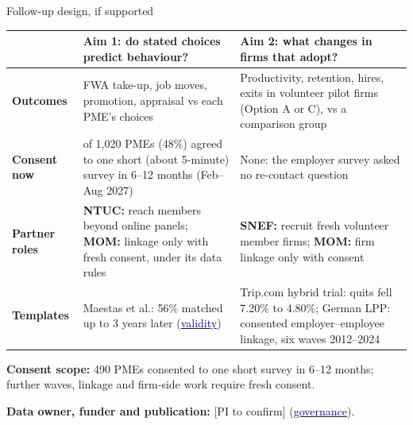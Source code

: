 \begin{frame}[t,label=B-followup]{Follow-up design, if supported}
  \FrameTop %
  {\TableFont\setlength{\tabcolsep}{4pt}\renewcommand{\arraystretch}{1.0}\renewcommand{\RowSep}{\addlinespace[1.5pt]}%
  \begin{tabularx}{\linewidth}{@{}>{\RaggedRight}p{1.85cm}>{\RaggedRight}X>{\RaggedRight\arraybackslash}X@{}}
    \toprule
     & \textbf{Aim 1: do stated choices predict behaviour?} & \textbf{Aim 2: what changes in firms that adopt?}\\
    \midrule
    \textbf{Outcomes} & FWA take-up, job moves, promotion, appraisal vs each PME's choices & Productivity, retention, hires, exits in volunteer pilot firms (Option A or C), vs a comparison group\\ \RowSep
    \textbf{Consent now} & 490 of 1,020 PMEs (48\%) agreed to one short (about 5-minute) survey in 6--12 months (Feb--Aug 2027) & None: the employer survey asked no re-contact question\\ \RowSep
    \textbf{Partner roles} & \textbf{NTUC:} reach members beyond online panels; \textbf{MOM:} linkage only with fresh consent, under its data rules & \textbf{SNEF:} recruit fresh volunteer member firms; \textbf{MOM:} firm linkage only with consent\\ \RowSep
    \textbf{Templates} & Maestas et al.: 56\% matched up to 3 years later (\hyperlink{B-validity}{\textcolor{Navy}{validity}}) & Trip.com hybrid trial: quits fell 7.20\% to 4.80\%; German LPP: consented employer--employee linkage, six waves 2012--2024\\
    \bottomrule
  \end{tabularx}\par}
  \vspace{0.08cm}
  {\fontsize{9}{11}\selectfont\RaggedRight
    \textbf{Consent scope:} 490 PMEs consented to one short survey in 6--12 months; further waves, linkage and firm-side work require fresh consent.\par %
    \vspace{0.06cm}
    \textbf{Data owner, funder and publication:} [PI to confirm] (\hyperlink{B-governance}{\textcolor{Navy}{governance}}).\par}
\end{frame}

